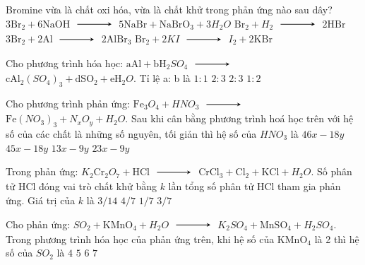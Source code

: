 \begin{ex}
	Bromine vừa là chất oxi hóa, vừa là chất khử trong phản ứng nào sau dây?
	\choice
	{\True $3 \mathrm{Br}_2+6 \mathrm{NaOH} $ $\xrightarrow$ $ 5 \mathrm{NaBr}+\mathrm{NaBrO}_3+3 H_2O$}
	{$\mathrm{Br}_2+H_2$ $\xrightarrow$ $ 2\mathrm{HBr}$}
	{$3\mathrm{Br}_2+2\mathrm{Al} $ $\xrightarrow$ $ 2\mathrm{AlBr}_3$}
	{$\mathrm{Br}_2+2KI $ $\xrightarrow$ $ I_2+2\mathrm{KBr}$}
\end{ex}
\begin{ex}[Đề TSCĐ-2014]
	Cho phương trình hóa học:
	$\mathrm{aAl}+\mathrm{bH}_2SO_4$ $\xrightarrow$ $ \mathrm{cAl}_2\left(SO_4\right)_3+\mathrm{dSO}_2+\mathrm{eH}_2O$. Tỉ lệ a: b là
	\choice
	{$1: 1$}
	{$2: 3$}
	{\True $2: 3$}
	{$1: 2$}
\end{ex}
\begin{ex}
	Cho phương trình phản ứng:
	$\mathrm{Fe}_3 O_4+HNO_3 $ $\xrightarrow$ $ \mathrm{Fe}\left(NO_3\right)_3+N_x O_y+H_2O$. Sau khi cân bằng phương trình hoá học trên với hệ số của các chất là những số nguyên, tối giản thì hệ số của $HNO_3$ là
	\choice
	{\True $46x-18y$}
	{$45x-18y$}
	{$13x-9y$}
	{$23x-9y$}
\end{ex}
\begin{ex}[Đề TSĐH A-2010]
	Trong phản ứng: $K_2 \mathrm{Cr}_2 O_7+\mathrm{HCl} $ $\xrightarrow$ $ \mathrm{CrCl}_3+\mathrm{Cl}_2+\mathrm{KCl}+H_2O$. Số phân tử $\mathrm{HCl}$ đóng vai trò chất khử bằng $k$ lần tổng số phân tử $\mathrm{HCl}$ tham gia phản ứng. Giá trị của $k$ là
	\choice
	{$3/ 14$}
	{$4/ 7$}
	{$1/ 7$}
	{\True $3/ 7$}
\end{ex}
\begin{ex}[Đề TSĐH B-2014]
	Cho phản ứng: $SO_2+\mathrm{KMnO}_4+H_2O $ $\xrightarrow$ $ K_2 SO_4+\mathrm{MnSO}_4+H_2 SO_4$. Trong phương trình hóa học của phản ứng trên, khi hệ số của $\mathrm{KMnO}_4$ là 2 thì hệ số của $SO_2$ là
	\choice
	{$4$}
	{\True $5$}
	{$6$}
	{$7$}
\end{ex}
